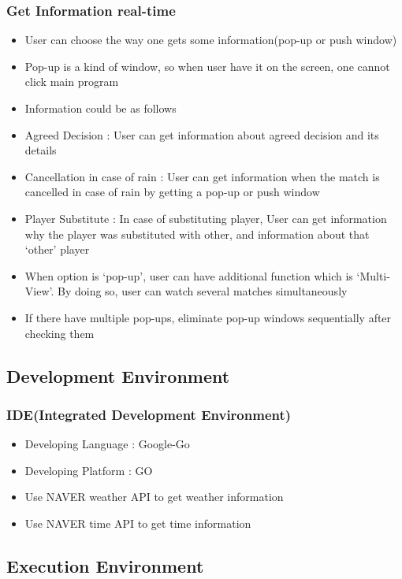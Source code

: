 \documentclass[conference,compsoc, twocolumn]{IEEEtran}
\begin{document}
\subsubsection{Get Information real-time}
\begin{itemize}
\item User can choose the way one gets some information(pop-up or push window)
\item Pop-up is a kind of window, so when user have it on the screen, one cannot click main program
\item Information could be as follows
\item Agreed Decision : User can get information about agreed decision and its details
\item Cancellation in case of rain : User can get information when the match is cancelled in case of rain by getting a pop-up or push window
\item Player Substitute : In case of substituting player, User can get information why the player was substituted with other, and information about that ‘other’ player
\item When option is ‘pop-up’, user can have additional function which is ‘Multi-View’.  By doing so, user can watch several matches simultaneously
\item If there have multiple pop-ups, eliminate pop-up windows sequentially after checking them
\end{itemize}

\subsection{Development Environment}


\subsubsection{IDE(Integrated Development Environment)}
\begin{itemize}
\item Developing Language : Google-Go
\item Developing Platform : GO 
\item Use NAVER weather API to get weather information
\item Use NAVER time API to get time information
\end{itemize}

\subsection{Execution Environment}
\end{document}
